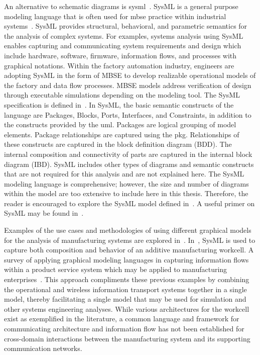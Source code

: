 An alternative to schematic diagrams is \gls{sysml}~\cite{SysML2017}. SysML is a general purpose modeling language that is often used for \gls{mbse} practice within industrial systems~\cite{MBSEandSysML}. SysML provides structural, behavioral, and parametric semantics for the analysis of complex systems. For examples, systems analysis using SysML enables capturing and communicating system requirements and design which include hardware, software, firmware, information flows, and processes with graphical notations. Within the factory automation industry, engineers are adopting SysML in the form of MBSE to develop realizable operational models of the factory and data flow processes. MBSE models address verification of design through executable simulations depending on the modeling tool.  The SysML specification is defined in~\cite{SysML2017}.  In SysML, the basic semantic constructs of the language are Packages, Blocks, Ports, Interfaces, and Constraints, in addition to the constructs provided by the \gls{uml}. Packages are logical grouping of model elements. Package relationships are captured using the \gls{pkg}. Relationships of these constructs are captured in the block definition diagram (BDD).  The internal composition and connectivity of parts are captured in the internal block diagram (IBD). SysML includes other types of diagrams and semantic constructs that are not required for this analysis and are not explained here. The SysML modeling language is comprehensive; however, the size and number of diagrams within the model are too extensive to include here in this thesis.  Therefore, the reader is encouraged to explore the SysML model defined in~\cite{Candell2018SysML.JRES}.  A useful primer on SysML may be found in~\cite{Friedenthal2015.SysML}. 

Examples of the use cases and methodologies of using different graphical models for the analysis of manufacturing systems are explored in~\cite{Lutjen2015.GramosaMethod,Luder2011.GraphicalModeling,Jia2013.GraphicalModeling,Alvarez2013.GraphicalModeling}.  In~\cite{Quinsat2017.SysML}, SysML is used to capture both composition and behavior of an additive manufacturing workcell.  A survey of applying graphical modeling languages in capturing information flows within a product service system which may be applied to manufacturing enterprises~\cite{Durugbo2011.GraphicalModeling}.  This approach compliments these previous examples by combining the operational and wireless information transport systems together in a single model, thereby facilitating a single model that may be used for simulation and other systems engineering analyses.  While various architectures for the workcell exist as exemplified in the literature, a common language and framework for communicating architecture and information flow has not been established for cross-domain interactions between the manufacturing system and its supporting communication networks.  

